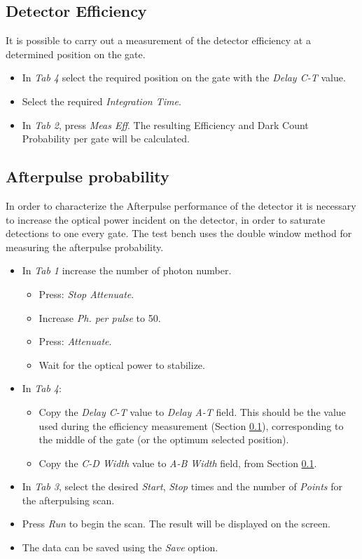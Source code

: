 \documentclass{article}
\begin{document}

\subsection{Detector Efficiency}
\label{sec:eff}
It is possible to carry out a measurement of the detector efficiency at a determined position on the gate.
\begin{itemize}
\item
In \emph{Tab 4} select the required position on the gate with the \emph{Delay C-T} value.
\item 
Select the required \emph{Integration Time}.
\item
In \emph{Tab 2}, press \emph{Meas Eff}. The resulting Efficiency and Dark Count Probability per gate will be calculated. 

\end{itemize}



\subsection{Afterpulse probability}

In order to characterize the Afterpulse performance of the detector it is necessary to increase the optical power incident on the detector, in order to saturate detections to one every gate. The test bench uses the double window method for measuring the afterpulse probability.

\begin{itemize}
\item
In \emph{Tab 1} increase the number of photon number.
\begin{itemize}
\item
Press: \emph{Stop Attenuate}.
\item
Increase \emph{Ph. per pulse} to 50.
\item
Press: \emph{Attenuate}.
\item
Wait for the optical power to stabilize.
\end{itemize}

\item
In \emph{Tab 4}:
\begin{itemize}
\item
Copy the \emph{Delay C-T} value to \emph{Delay A-T} field. This should be the value used during the efficiency measurement (Section \ref{sec:eff}), corresponding to the middle of the gate (or the optimum selected position).
\item
Copy the \emph{C-D Width} value to \emph{A-B Width} field, from Section \ref{sec:eff}. 
\end{itemize}

\item
In \emph{Tab 3}, select the desired \emph{Start}, \emph{Stop} times and the number of \emph{Points} for the afterpulsing scan.
\item
Press \emph{Run} to begin the scan. The result will be displayed on the screen. 
\item
The data can be saved using the \emph{Save} option.

\end{itemize}
\end{document}
